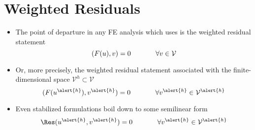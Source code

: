 \section{Weighted Residuals}
%

\begin{frame}[<+->]
  \begin{itemize}
  \item {The point of departure in any FE analysis which uses \libMesh{} is
    the weighted residual statement
    \begin{equation}
      \nonumber
      (F( u ), v) = 0 \hspace{.5in} \forall v \in \mathcal{V}
    \end{equation}
    }

  \item{ Or, more precisely, the weighted residual statement associated with the
    finite-dimensional space $\mathcal{V}^h \subset \mathcal{V}$
    \begin{equation}
      \nonumber
      (F( u^{\alert{h}} ), v^{\alert{h}}) = 0 \hspace{.5in} \forall v^{\alert{h}} \in \mathcal{V}^{\alert{h}}
  \end{equation}}

  \item{ Even stabilized formulations boil down to some semilinear
          form
    \begin{equation}
      \nonumber
      \Res( u^{\alert{h}}, v^{\alert{h}}) = 0 \hspace{.5in} \forall v^{\alert{h}} \in \mathcal{V}^{\alert{h}}
  \end{equation}}

  \end{itemize}
\end{frame}





